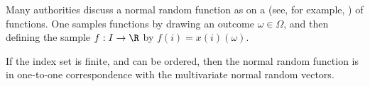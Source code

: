 
Many authorities discuss a normal random function as  on a  (see, for example, ) of functions.
One samples functions by drawing an outcome $\omega \in \Omega$, and then defining the sample $f: I \to \R$ by $f(i) = x(i)(\omega)$.


If the index set is finite, and can be ordered, then the normal random function is in one-to-one correspondence with the multivariate normal random vectors.

